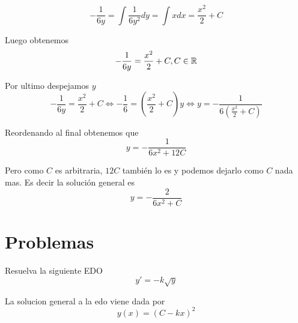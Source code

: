\documentclass[a4paper,oneside,10.5pt]{article}
\begin{document}
\begin{enumerate}
\begin{ejemplo}
    \begin{equation*}
    -\frac{1}{6y} = \int \frac{1}{6y^{2}}  dy = \int x dx = \frac{x^{2}}{2} + C
    \end{equation*}

    Luego obtenemos
    \begin{equation*}
     -\frac{1}{6y} = \frac{x^{2}}{2} + C, C \in \mathbb{R}
    \end{equation*}

    Por ultimo despejamos $y$
    \begin{equation*}
      -\frac{1}{6y} = \frac{x^{2}}{2} + C \iff -\frac{1}{6} = (\frac{x^{2}}{2} + C)y \iff y = -\frac{1}{6(\frac{x^{2}}{2} + C)}
    \end{equation*}

    Reordenando al final obtenemos que
    \begin{equation*}
      y = -\frac{1}{6x^{2} + 12C}
    \end{equation*}

    Pero como $C$ es arbitraria, $12C$ también lo es y podemos dejarlo como $C$ nada mas.
    Es decir la solución general es
    \begin{equation*}
      y = -\frac{2}{6x^{2} + C}
    \end{equation*}
  \end{ejemplo}

\end{enumerate}
\section*{Problemas}
\begin{prob}
  Resuelva la siguiente EDO
  \begin{equation*}
    y' = -k\sqrt{y}
  \end{equation*}
\end{prob}
\begin{sol}
  La solucion general a la edo viene dada por
  \begin{equation*}
    y(x) = (C - kx)^{2}
  \end{equation*}
\end{sol}
\end{document}

